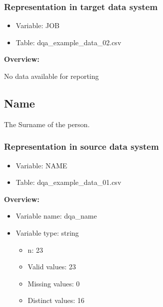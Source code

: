 \documentclass[
]{article}
\providecommand{\tightlist}{%
  \setlength{\itemsep}{0pt}\setlength{\parskip}{0pt}}
\begin{document}
\hypertarget{representation-in-target-data-system-8}{%
\subsubsection{\texorpdfstring{Representation in \textbf{target} data
system}{Representation in target data system}}\label{representation-in-target-data-system-8}}

\begin{itemize}
\tightlist
\item
  Variable: JOB
\item
  Table: dqa\_example\_data\_02.csv
\end{itemize}

\textbf{Overview:}

No data available for reporting

\newpage

\hypertarget{name}{%
\subsection{Name}\label{name}}

The Surname of the person.

\hypertarget{representation-in-source-data-system-9}{%
\subsubsection{\texorpdfstring{Representation in \textbf{source} data
system}{Representation in source data system}}\label{representation-in-source-data-system-9}}

\begin{itemize}
\tightlist
\item
  Variable: NAME
\item
  Table: dqa\_example\_data\_01.csv
\end{itemize}

\textbf{Overview:}

\begin{itemize}
\tightlist
\item
  Variable name: dqa\_name
\item
  Variable type: string

  \begin{itemize}
  \tightlist
  \item
    n: 23
  \item
    Valid values: 23
  \item
    Missing values: 0
  \item
    Distinct values: 16
  \end{itemize}
\end{itemize}
\end{document}
